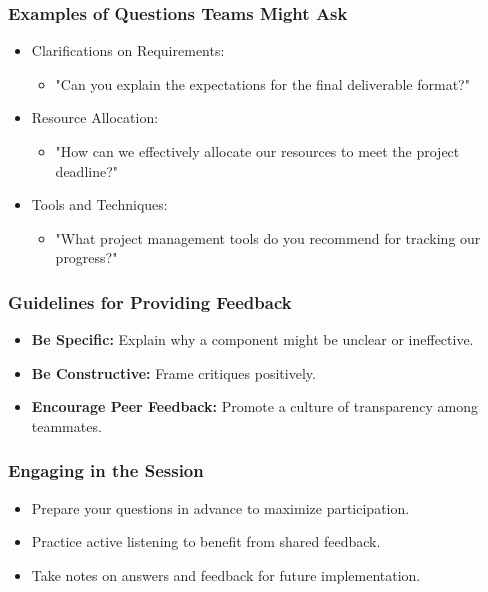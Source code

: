 \documentclass{beamer}
\begin{document}
\begin{frame}[fragile]
    \frametitle{Examples of Questions Teams Might Ask}
    \begin{itemize}
        \item Clarifications on Requirements:
        \begin{itemize}
            \item "Can you explain the expectations for the final deliverable format?"
        \end{itemize}
        
        \item Resource Allocation:
        \begin{itemize}
            \item "How can we effectively allocate our resources to meet the project deadline?"
        \end{itemize}
        
        \item Tools and Techniques:
        \begin{itemize}
            \item "What project management tools do you recommend for tracking our progress?"
        \end{itemize}
    \end{itemize}
\end{frame}

\begin{frame}[fragile]
    \frametitle{Guidelines for Providing Feedback}
    \begin{itemize}
        \item \textbf{Be Specific:} Explain why a component might be unclear or ineffective.
        \item \textbf{Be Constructive:} Frame critiques positively.
        \item \textbf{Encourage Peer Feedback:} Promote a culture of transparency among teammates.
    \end{itemize}
\end{frame}

\begin{frame}[fragile]
    \frametitle{Engaging in the Session}
    \begin{itemize}
        \item Prepare your questions in advance to maximize participation.
        \item Practice active listening to benefit from shared feedback.
        \item Take notes on answers and feedback for future implementation.
    \end{itemize}
\end{frame}
\end{document}
